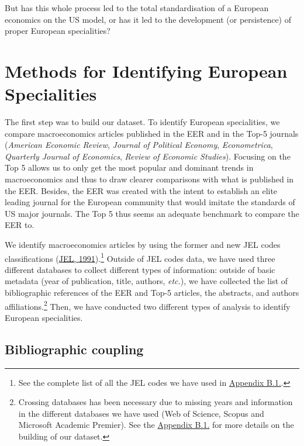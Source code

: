 \documentclass[]{elsarticle} %
\begin{document}
But has this whole process led to the total standardisation of a
European economics on the US model, or has it led to the development (or
persistence) of proper European specialities?

\hypertarget{european-specialities}{%
\section{Methods for Identifying European
Specialities}\label{european-specialities}}

The first step was to build our dataset. To identify European
specialities, we compare macroeconomics articles published in the EER
and in the Top-5 journals (\emph{American Economic Review},
\emph{Journal of Political Economy}, \emph{Econometrica},
\emph{Quarterly Journal of Economics}, \emph{Review of Economic
Studies}). Focusing on the Top 5 allows us to only get the most popular
and dominant trends in macroeconomics and thus to draw clearer
comparisons with what is published in the EER. Besides, the EER was
created with the intent to establish an elite leading journal for the
European community that would imitate the standards of US major
journals. The Top 5 thus seems an adequate benchmark to compare the EER
to.

We identify macroeconomics articles by using the former and new JEL
codes classifications (\protect\hyperlink{ref-jel1991}{JEL,
1991}).\footnote{See the complete list of all the JEL codes we have used
  in \protect\hyperlink{eer-top5-macro}{Appendix B.1.}.} Outside of JEL
codes data, we have used three different databases to collect different
types of information: outside of basic metadata (year of publication,
title, authors, \emph{etc.}), we have collected the list of
bibliographic references of the EER and Top-5 articles, the abstracts,
and authors affiliations.\footnote{Crossing databases has been necessary
  due to missing years and information in the different databases we
  have used (Web of Science, Scopus and Microsoft Academic Premier). See
  the \protect\hyperlink{corpus}{Appendix B.1.} for more details on the
  building of our dataset.} Then, we have conducted two different types
of analysis to identify European specialities.

\hypertarget{bibliographic-coupling}{%
\subsection{Bibliographic coupling}\label{bibliographic-coupling}}
\end{document}
